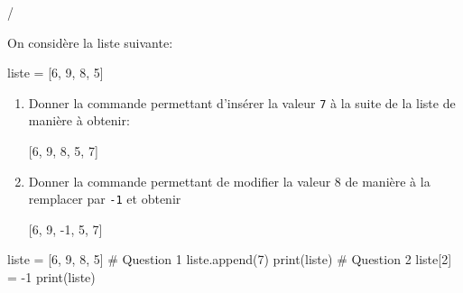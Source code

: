 \documentclass[a4paper]{article}
\begin{document}
\medskip
\begin{exerciceinterro}{\hspace{2cm}\dotfill/}{}

On considère la liste suivante:

\begin{CodePythontexAlt}[Largeur=17cm,
TaillePolice = \normalsize, 
EspacementVertical = 1.2,
Lignes=false]{}
liste = [6, 9, 8, 5]
\end{CodePythontexAlt}


\begin{enumerate}

\item Donner la commande permettant d'insérer la valeur \verb+7+ à la suite de la liste de manière à obtenir:

\begin{CodePythontexAlt}[Largeur=17cm,
TaillePolice = \normalsize, 
EspacementVertical = 1.2,
Lignes=false]{}
[6, 9, 8, 5, 7]
\end{CodePythontexAlt}



\item Donner la commande permettant de modifier la valeur 8 de manière à la remplacer par \verb+-1+ et obtenir 

\begin{CodePythontexAlt}[Largeur=17cm,
TaillePolice = \normalsize, 
EspacementVertical = 1.2,
Lignes=false]{}
[6, 9, -1, 5, 7]
\end{CodePythontexAlt}



\end{enumerate}

\begin{ConsolePythontex}[Largeur=14cm,Label=false,Centre,TaillePolice = \normalsize, 
]{}
liste = [6, 9, 8, 5]
# Question 1
liste.append(7)
print(liste)
# Question 2
liste[2] = -1
print(liste)
\end{ConsolePythontex}


\end{exerciceinterro}
\end{document}
